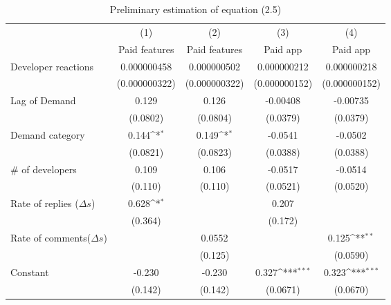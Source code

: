 \documentclass[13pt]{article}
\numberwithin{figure}{section}
\numberwithin{table}{section}
\theoremstyle{indented}
\numberwithin{equation}{section} %
\begin{document}
\begin{table}

\centering
\caption{Preliminary estimation of equation (2.5)}
\label{tab2}
\def\sym#1{\ifmmode^{#1}\else\(^{#1}\)\fi}
\begin{tabular}{l*{4}{c}}
\hline\hline
            &\multicolumn{1}{c}{(1)}&\multicolumn{1}{c}{(2)}&\multicolumn{1}{c}{(3)}&\multicolumn{1}{c}{(4)}\\
            &\multicolumn{1}{c}{Paid features}&\multicolumn{1}{c}{Paid features}&\multicolumn{1}{c}{Paid app}&\multicolumn{1}{c}{Paid app}\\
\hline
Developer reactions& 0.000000458         & 0.000000502         & 0.000000212         & 0.000000218         \\
            &(0.000000322)         &(0.000000322)         &(0.000000152)         &(0.000000152)         \\
[1em]
Lag of Demand      &       0.129         &       0.126         &    -0.00408         &    -0.00735         \\
            &    (0.0802)         &    (0.0804)         &    (0.0379)         &    (0.0379)         \\
[1em]
Demand category&       0.144\sym{*}  &       0.149\sym{*}  &     -0.0541         &     -0.0502         \\
            &    (0.0821)         &    (0.0823)         &    (0.0388)         &    (0.0388)         \\
[1em]
\# of developers &       0.109         &       0.106         &     -0.0517         &     -0.0514         \\
            &     (0.110)         &     (0.110)         &    (0.0521)         &    (0.0520)         \\
[1em]
Rate of replies ($\Delta s$)   &       0.628\sym{*}  &                     &       0.207         &                     \\
            &     (0.364)         &                     &     (0.172)         &                     \\
[1em]
Rate of comments($\Delta s$) &                     &      0.0552         &                     &       0.125\sym{**} \\
            &                     &     (0.125)         &                     &    (0.0590)         \\
[1em]
Constant      &      -0.230         &      -0.230         &       0.327\sym{***}&       0.323\sym{***}\\
            &     (0.142)         &     (0.142)         &    (0.0671)         &    (0.0670)         \\

\end{tabular}
\end{table}
\end{document}
